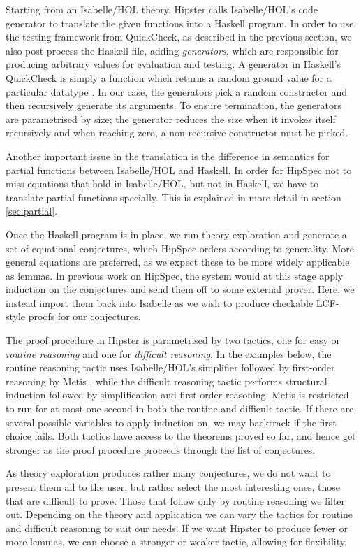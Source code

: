 Starting from an Isabelle/HOL theory, Hipster calls Isabelle/HOL's code generator \cite{codegen2,codegen} to translate the given functions into a Haskell program. In order to use the testing framework from QuickCheck, as described in the previous section, we also post-process the Haskell file, adding \emph{generators}, which are responsible for producing arbitrary values for evaluation and testing. A generator in Haskell's QuickCheck is simply a function which returns a random ground value for a particular datatype \cite{quickcheck}. In our case, the generators pick a random constructor and then recursively generate its arguments. To ensure termination, the generators are parametrised by size; the generator reduces the size when it invokes itself recursively and when reaching zero, a non-recursive constructor must be picked. 

Another important issue in the translation is the difference in
semantics for partial functions between Isabelle/HOL and Haskell. In order
for HipSpec not to miss equations that hold in Isabelle/HOL, but not in
Haskell, we have to translate partial functions specially.
This is explained in more detail in section \ref{sec:partial}.

Once the Haskell program is in place, we run theory exploration and generate a set of equational conjectures, which HipSpec orders according to generality. More general equations are preferred, as we expect these to be more widely applicable as lemmas. In previous work on HipSpec, the system would at this stage apply induction on the conjectures and send them off to some external prover. Here, we instead import them back into Isabelle as we wish to produce checkable LCF-style proofs for our conjectures. 

The proof procedure in Hipster is parametrised by two tactics, one for easy or \emph{routine reasoning} and one for \emph{difficult reasoning}. In the examples below, the routine reasoning tactic uses
Isabelle/HOL's simplifier followed by first-order reasoning by Metis
\cite{metis}, while the difficult reasoning tactic performs structural induction followed by simplification and first-order reasoning. 
Metis is restricted to run for at most one second in both the routine and difficult tactic. If there are several possible variables to apply induction on, we may backtrack if the first choice fails. Both tactics have access to the theorems proved so far, and hence get stronger as the proof procedure proceeds through the list of conjectures. 

As theory exploration produces rather many conjectures, we do not want
to present them all to the user, but rather select the most
interesting ones, those that are difficult to prove. Those that follow only by routine reasoning we filter out.
Depending on the theory and application we can vary the tactics for routine and difficult reasoning to suit our needs. If we want Hipster to produce fewer or more lemmas, we can choose a stronger or weaker tactic, allowing for flexibility.

